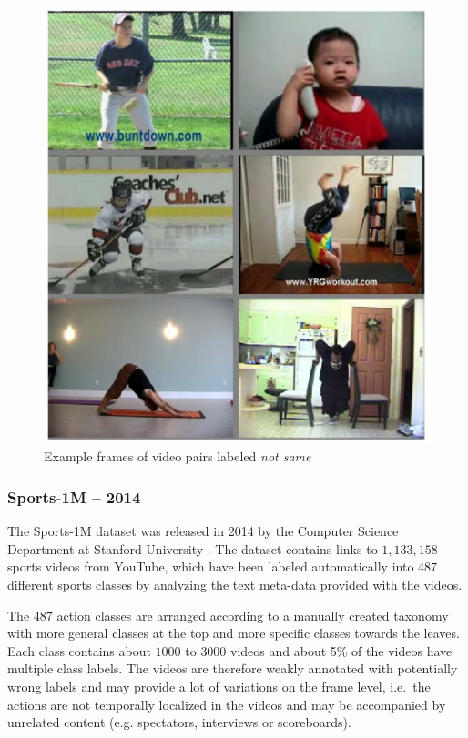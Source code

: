 \begin{minipage}[t]{0.4\textwidth}
    \begin{figure}[H]
        \centering
        \includegraphics[width=\textwidth]{img_datasets/aslan_different}
        \caption{Example frames of video pairs labeled \textit{not same} \cite{kliper-gross_action_2012}}
        \label{fig:aslan_different}
    \end{figure}
\end{minipage}


\subsubsection{Sports-1M -- 2014} \cite{karpathy_large-scale_2014}
The Sports-1M dataset was released in 2014 by the Computer Science Department at Stanford University \cite{karpathy_large-scale_2014}.
The dataset contains links to $1,133,158$ sports videos from YouTube, which have been labeled automatically into $487$ different sports classes by analyzing the text meta-data provided with the videos.

The $487$ action classes are arranged according to a manually created taxonomy with more general classes at the top and more specific classes towards the leaves.
Each class contains about $1000$ to $3000$ videos and about 5\% of the videos have multiple class labels.
The videos are therefore weakly annotated with potentially wrong labels and may provide a lot of variations on the frame level, i.e.\ the actions are not temporally localized in the videos and may be accompanied by unrelated content (e.g. spectators, interviews or scoreboards).

